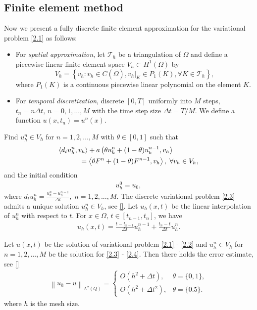 \documentclass[twocolumn]{article}
\begin{document}
\subsection{Finite element method}
\quad Now we present a fully discrete finite element approximation for the variational problem \eqref{2.1} as follows:
\begin{itemize}
	\item For \textit{spatial approximation}, let $\mathcal{T}_h$ be a triangulation of $\Omega$ and define a piecewise linear finite element space $V_h \subset H^1(\Omega)$ by
	$$V_h=\left\{v_h:v_h\in C(\overline{\Omega}), v_h|_K\in P_1(K), \forall K\in \mathcal{T}_h\right\},$$
	where $P_1(K)$ is a continuous piecewise linear polynomial on the element $K$.
	\item For \textit{temporal discretization}, discrete $[0, T]$ uniformly into $M$ steps, $t_n=n\Delta t,\, n=0, 1, \dots, M$ with the time step size $\Delta t = T/M$. We define a function $u(x, t_n)=u^n(x)$.
\end{itemize}
Find $u^n_h\in V_h$ for $n=1, 2, \dots, M$ with $\theta \in [0, 1]$ such that
\begin{align}\label{2.3}
	&\langle d_tu^n_h, v_h \rangle+a\left(\theta u^n_h+(1-\theta)u^{n-1}_h, v_h\right)\notag\\
	&\qquad\quad=\left\langle \theta F^n+(1-\theta)F^{n-1}, v_h \right\rangle, \; \forall v_h\in V_h,
\end{align}
and the initial condition 
\begin{align}\label{2.4}
	u^0_h=u_0,
\end{align}
where $d_tu^n_h=\frac{u^n_h-u^{n-1}_h}{\Delta t}, \; n=1, 2, ..., M$.
The discrete variational problem \eqref{2.3} admits a unique solution $u^n_h\in V_h$, see \eqref{}. Let $u_h(x, t)$ be the linear interpolation of $u_h^n$ with respect to $t$. 
For $x\in \Omega,\, t\in [t_{n-1}, t_n]$, we have
\begin{align*}
	u_h(x, t)=\frac{t-t_{n-1}}{\Delta t}u_h^{n-1}+\frac{t_n-t}{\Delta t}u_h^{n}.
\end{align*}
\begin{dl}\label{dl2.1}
	Let $u(x, t)$ be the solution of variational problem \eqref{2.1} - \eqref{2.2} and $u^n_h\in V_h$ for $n=1, 2, \dots, M$ be the solution for \eqref{2.3} - \eqref{2.4}. Then there holds the error estimate, see \eqref{}
	\begin{align}\label{2.5}
		\left\|u_h-u\right\|_{L^2(Q)}=
		\begin{cases}
			O\left(h^2+\Delta t\right), &\theta=\{0, 1\},\\
			O\left(h^2+\Delta t^2\right), &\theta=\{0.5\}.
		\end{cases}		
	\end{align}
	where $h$ is the mesh size.
\end{dl}
\end{document}
